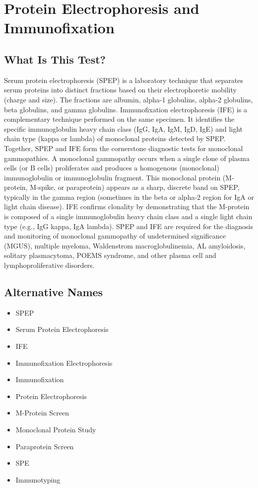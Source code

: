 \chapter{Protein Electrophoresis and Immunofixation}

\section*{What Is This Test?}
Serum protein electrophoresis (SPEP) is a laboratory technique that separates serum proteins into distinct fractions based on their electrophoretic mobility (charge and size). The fractions are albumin, alpha-1 globulins, alpha-2 globulins, beta globulins, and gamma globulins. Immunofixation electrophoresis (IFE) is a complementary technique performed on the same specimen. It identifies the specific immunoglobulin heavy chain class (IgG, IgA, IgM, IgD, IgE) and light chain type (kappa or lambda) of monoclonal proteins detected by SPEP. Together, SPEP and IFE form the cornerstone diagnostic tests for monoclonal gammopathies. A monoclonal gammopathy occurs when a single clone of plasma cells (or B cells) proliferates and produces a homogenous (monoclonal) immunoglobulin or immunoglobulin fragment. This monoclonal protein (M-protein, M-spike, or paraprotein) appears as a sharp, discrete band on SPEP, typically in the gamma region (sometimes in the beta or alpha-2 region for IgA or light chain disease). IFE confirms clonality by demonstrating that the M-protein is composed of a single immunoglobulin heavy chain class and a single light chain type (e.g., IgG kappa, IgA lambda). SPEP and IFE are required for the diagnosis and monitoring of monoclonal gammopathy of undetermined significance (MGUS), multiple myeloma, Waldenstrom macroglobulinemia, AL amyloidosis, solitary plasmacytoma, POEMS syndrome, and other plasma cell and lymphoproliferative disorders.

\section*{Alternative Names}
\begin{itemize}
  \item SPEP
  \item Serum Protein Electrophoresis
  \item IFE
  \item Immunofixation Electrophoresis
  \item Immunofixation
  \item Protein Electrophoresis
  \item M-Protein Screen
  \item Monoclonal Protein Study
  \item Paraprotein Screen
  \item SPE
  \item Immunotyping
\end{itemize}
